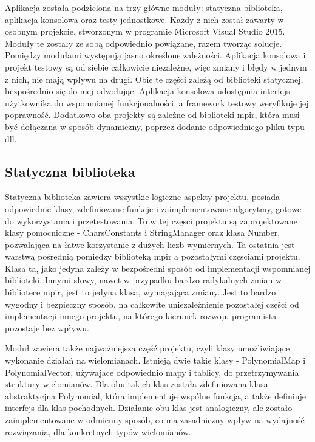 \documentclass[twoside,a4paper]{book}
\begin{document}
Aplikacja została podzielona na trzy główne moduły: statyczna biblioteka, aplikacja konsolowa oraz testy jednostkowe. Każdy z nich został zawarty w osobnym projekcie, stworzonym w programie Microsoft Visual Studio 2015. Moduły te zostały ze sobą odpowiednio powiązane, razem tworząc solucje. Pomiędzy modułami występują jasno określone zależności. Aplikacja konsolowa i projekt testowy są od siebie całkowicie niezależne, więc zmiany i błędy w jednym z nich, nie mają wpływu na drugi. Obie te części zależą od biblioteki statycznej, bezpośrednio się do niej odwołując. Aplikacja konsolowa udostępnia interfejs użytkownika do wspomnianej funkcjonalności, a framework testowy weryfikuje jej poprawność. Dodatkowo oba projekty są zależne od biblioteki mpir, która musi być dołączana w sposób dynamiczny, poprzez dodanie odpowiedniego pliku typu dll. 

\subsection{Statyczna biblioteka}

Statyczna biblioteka zawiera wszystkie logiczne aspekty projektu, posiada odpowiednie klasy, zdefiniowane funkcje i zaimplementowane algorytmy, gotowe do wykorzystania i przetestowania. To w tej częsci projektu są zaprojektowane klasy pomocniczne - CharsConstants i StringManager oraz klasa Number, pozwalająca na łatwe korzystanie z dużych liczb wymiernych. Ta ostatnia jest warstwą pośrednią pomiędzy biblioteką mpir a pozostałymi częsciami projektu. Klasa ta, jako jedyna zależy w bezpośredni sposób od implementacji wspomnianej biblioteki. Innymi słowy, nawet w przypadku bardzo radykalnych zmian w bibliotece mpir, jest to jedyna klasa, wymagająca zmiany. Jest to bardzo wygodny i bezpieczny sposób, na całkowite uniezależnienie pozostałej części od implementacji innego projektu, na którego kierunek rozwoju programista pozostaje bez wpływu.

Moduł zawiera także najważniejszą część projektu, czyli klasy umożliwiające wykonanie działań na wielomianach. Istnieją dwie takie klasy - PolynomialMap i PolynomialVector, używajace odpowiednio mapy i tablicy, do przetrzymywania struktury wielomianów. Dla obu takich klas została zdefiniowana klasa abstraktycjna Polynomial, która implementuje wspólne funkcja, a także definiuje interfejs dla klas pochodnych. Działanie obu klas jest analogiczny, ale zostało zaimplementowane w odmienny sposób, co ma zasadniczny wpływ na wydajność rozwiązania, dla konkretnych typów wielomianów.
\end{document}
